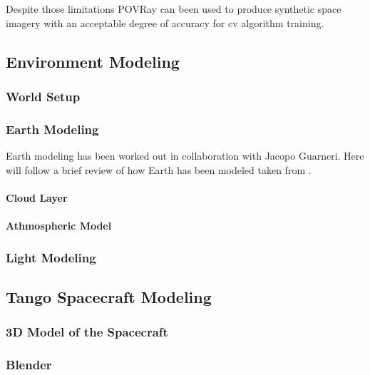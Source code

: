 Despite those limitations POVRay can been used to produce synthetic space imagery with an acceptable degree of accuracy for \acrshort{cv} algorithm training.\\

\subsection{Environment Modeling}

\subsubsection{World Setup}

\subsubsection{Earth Modeling}
Earth modeling has been worked out in collaboration with Jacopo Guarneri.
Here will follow a brief review of how Earth has been modeled taken from \cite{jacopo}.

\paragraph{Cloud Layer}

\paragraph{Athmospheric Model}

\subsubsection{Light Modeling}

\subsection{Tango Spacecraft Modeling}

\subsubsection{3D Model of the Spacecraft}

\subsubsection{Blender}

